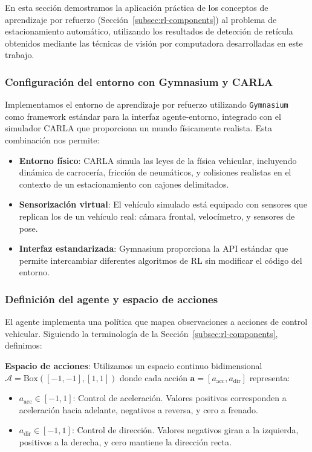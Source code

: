 \noindent
En esta sección demostramos la aplicación práctica de los conceptos de aprendizaje por refuerzo
(Sección~\ref{subsec:rl-components}) al problema de estacionamiento automático, utilizando
los resultados de detección de retícula obtenidos mediante las técnicas de visión por computadora
desarrolladas en este trabajo.

\subsubsection{Configuración del entorno con Gymnasium y CARLA}\label{subsec:rl-environment}
\noindent
Implementamos el entorno de aprendizaje por refuerzo utilizando \texttt{Gymnasium} como framework
estándar para la interfaz agente-entorno, integrado con el simulador CARLA que proporciona
un mundo físicamente realista. Esta combinación nos permite:

\begin{itemize}
    \item \textbf{Entorno físico}: CARLA simula las leyes de la física vehicular, incluyendo
    dinámica de carrocería, fricción de neumáticos, y colisiones realistas en el contexto
    de un estacionamiento con cajones delimitados.
    
    \item \textbf{Sensorización virtual}: El vehículo simulado está equipado con sensores
    que replican los de un vehículo real: cámara frontal, velocímetro, y sensores de pose.
    
    \item \textbf{Interfaz estandarizada}: Gymnasium proporciona la API estándar que permite
    intercambiar diferentes algoritmos de RL sin modificar el código del entorno.
\end{itemize}

\subsubsection{Definición del agente y espacio de acciones}\label{subsec:rl-agent}
\noindent
El agente implementa una política que mapea observaciones a acciones de control vehicular.
Siguiendo la terminología de la Sección~\ref{subsec:rl-components}, definimos:

\noindent
\textbf{Espacio de acciones}: Utilizamos un espacio continuo bidimensional
$\mathcal{A} = \text{Box}([-1, -1], [1, 1])$ donde cada acción $\mathbf{a} = [a_{\text{acc}}, a_{\text{dir}}]$ representa:
\begin{itemize}
    \item $a_{\text{acc}} \in [-1, 1]$: Control de aceleración. Valores positivos corresponden
    a aceleración hacia adelante, negativos a reversa, y cero a frenado.
    \item $a_{\text{dir}} \in [-1, 1]$: Control de dirección. Valores negativos giran a la izquierda,
    positivos a la derecha, y cero mantiene la dirección recta.
\end{itemize}

